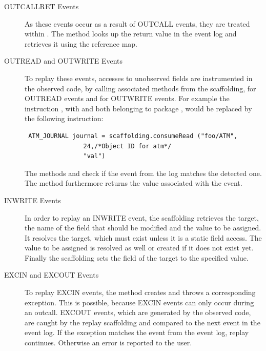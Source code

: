 \begin{description}
 \item [OUTCALLRET Events]As these events occur as a result of OUTCALL events, they are treated within . The method looks up the return value in the event log and retrieves it using the reference map. 
 \item [OUTREAD and OUTWRITE Events] To replay these events, accesses to unobserved fields are instrumented in the observed code, by calling associated methods from the scaffolding,  for OUTREAD events and  for OUTWRITE events. For example the instruction , with  and  both belonging to package , would be replaced by the following instruction:
\begin{lstlisting}
 ATM_JOURNAL journal = scaffolding.consumeRead ("foo/ATM",
                24,/*Object ID for atm*/
                "val")
\end{lstlisting}
The methods  and  check if the event from the log matches the detected one. The method  furthermore returns the value associated with the event.
 \item [INWRITE Events] In order to replay an INWRITE event, the scaffolding retrieves the target, the name of the field that should be modified and the value to be assigned. It resolves the target, which must exist unless it is a static field access. The value to be assigned is resolved as well or created if it does not exist yet. Finally the scaffolding sets the field of the target to the specified value.
 \item [EXCIN and EXCOUT Events]  To replay EXCIN events, the method  creates and throws a corresponding exception. This is possible, because EXCIN events can only occur during an outcall. EXCOUT events, which are generated by the observed code, are caught by the replay scaffolding and compared to the next event in the event log. If the exception matches the event from the event log, replay continues. Otherwise an error is reported to the user.
\end{description}

